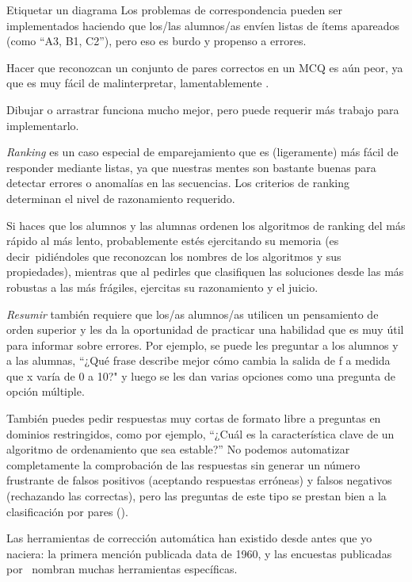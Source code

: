 \begin{aside}{Etiquetar un diagrama}
Los problemas de correspondencia pueden ser implementados haciendo que los/las alumnos/as envíen listas de ítems apareados 
(como ``A3, B1, C2''), 
pero eso es burdo y propenso a errores.

Hacer que reconozcan un conjunto de pares correctos en un MCQ es aún peor, 
ya que es muy fácil de malinterpretar, lamentablemente .

Dibujar o arrastrar funciona mucho mejor, 
pero puede requerir más trabajo para implementarlo.


\emph{Ranking} es un caso especial de emparejamiento 
que es (ligeramente) más fácil de responder mediante listas, 
ya que nuestras mentes son bastante buenas para detectar errores o anomalías en las secuencias.
Los criterios de ranking determinan el nivel de razonamiento requerido.

Si haces que los alumnos y las alumnas ordenen los algoritmos de ranking del más rápido al más lento, probablemente estés ejercitando su memoria 
(es decir\  pidiéndoles que reconozcan los nombres de los algoritmos y sus propiedades), mientras que al pedirles que clasifiquen las soluciones desde las más robustas a las más frágiles, ejercitas su razonamiento y el juicio.

\emph{Resumir} también requiere que los/as alumnos/as utilicen un pensamiento de orden superior y les da la oportunidad de practicar una habilidad que es muy útil para informar sobre errores.
Por ejemplo, 
se puede les preguntar a los alumnos y a las alumnas,
 ``¿Qué frase describe mejor cómo cambia la salida de f a medida que  x varía de 0 a 10?" 
y luego se les dan varias opciones como una pregunta de opción múltiple.

También puedes pedir respuestas muy cortas de formato libre a preguntas en dominios restringidos, como por ejemplo, ``¿Cuál es la característica clave de un algoritmo de ordenamiento que sea estable?”
No podemos automatizar completamente la comprobación de las respuestas sin generar un número frustrante de falsos positivos 
(aceptando respuestas erróneas) 
y falsos negativos (rechazando las correctas), 
pero las preguntas de este tipo se prestan bien a la clasificación por pares 
().


Las herramientas de corrección automática han existido desde antes que yo naciera: la primera mención publicada data de 1960, y las encuestas publicadas por~\cite{Douc2005,Ihan2010} nombran muchas herramientas específicas.


\end{aside}
